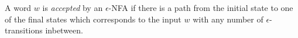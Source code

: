 

\setcounter{section}{1}
\setcounter{subsection}{4}
\setcounter{dfn}{12}


A word $w$ is \emph{accepted} by an $\epsilon$-NFA if
there is a path from the initial state to one of the final states which corresponds to the input $w$
with any number of $\epsilon$-transitions inbetween.


